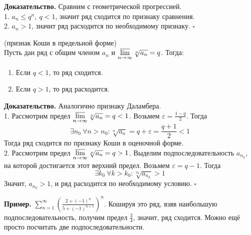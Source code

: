 \textbf{Доказательство.} Сравним с геометрической прогрессией.\\
1. $a_n\leqslant q^n,~q<1$, значит ряд сходится по признаку сравнения.\\
2. $a_n>1$, значит ряд расходится по необходимому признаку. $\square$ 
\begin{theor}
    (признак Коши в предельной форме)\\
    Пусть дан ряд с общим членом $a_n$ и 
    $\varlimsup\limits_{n \to \infty}\sqrt[n]{a_n}=q$. Тогда:
    \begin{enumerate}
        \item Если $q<1$, то ряд сходится.
        \item Если $q>1$, то ряд расходится.
    \end{enumerate}
\end{theor}
\textbf{Доказательство.} Аналогично признаку Даламбера.\\
1. Рассмотрим предел $\varlimsup\limits_{n \to \infty}\sqrt[n]{a_n}=q<1$. 
Возьмем $\varepsilon=\frac{1-q}{2}$. Тогда
$$\exists n_0~\forall n>n_0:\sqrt[n]{a_n}=q+\varepsilon=\frac{q+1}{2}<1$$
Тогда ряд сходится по признаку Коши в оценочной форме.\\
2. Рассмотрим предел $\varlimsup\limits_{n \to \infty}\sqrt[n]{a_n}=q>1$.
Выделим подпоследовательность $a_{n_k}$, на которой достигается этот верхний 
предел. Возьмем $\varepsilon=q-1$. Тогда
$$\exists k_0~\forall k>k_0:\sqrt[n_k]{a_{n_k}}>1$$
Значит, $a_{n_k}>1$, и ряд расходится по необходимому условию. 
$\square$

\textbf{Пример.} $\sum\limits_{n=1}^{\infty} \left(\frac{2+(-1)^{n}}
{5+(-1)^{n+1}}\right)^n$. Кошируя это ряд, взяв наибольшую
подпоследовательность, получим предел $\frac{3}{4}$, значит, ряд сходится. 
Можно ещё просто посчитать две подпоследовательности. 

